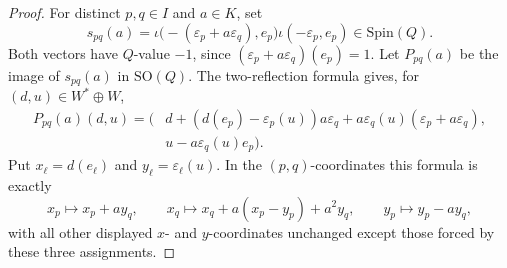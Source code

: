 \documentclass[10pt,a4paper]{amsart}
\newcommand{\SO}{\mathrm{SO}}
\newcommand{\Spin}{\mathrm{Spin}}
\begin{document}
\begin{proof}
For distinct \(p,q\in I\) and \(a\in K\), set
\[
  s_{pq}(a)=
    \iota\bigl(-(\varepsilon_p+a\varepsilon_q),e_p\bigr)
    \iota(-\varepsilon_p,e_p)\in \Spin(Q).
\]
Both vectors have \(Q\)-value \(-1\), since
\((\varepsilon_p+a\varepsilon_q)(e_p)=1\). Let \(P_{pq}(a)\) be the image of
\(s_{pq}(a)\) in \(\SO(Q)\). The two-reflection formula gives, for
\((d,u)\in W^*\oplus W\),
\[
\begin{aligned}
P_{pq}(a)(d,u)=
\bigl(&d+(d(e_p)-\varepsilon_p(u))a\varepsilon_q
        +a\varepsilon_q(u)(\varepsilon_p+a\varepsilon_q),\\
      &u-a\varepsilon_q(u)e_p\bigr).
\end{aligned}
\]
Put \(x_\ell=d(e_\ell)\) and \(y_\ell=\varepsilon_\ell(u)\). In the
\((p,q)\)-coordinates this formula is exactly
\[
  x_p\mapsto x_p+a y_q,\qquad
  x_q\mapsto x_q+a(x_p-y_p)+a^2y_q,\qquad
  y_p\mapsto y_p-a y_q,
\]
with all other displayed \(x\)- and \(y\)-coordinates unchanged except those
forced by these three assignments.


\end{proof}
\end{document}
